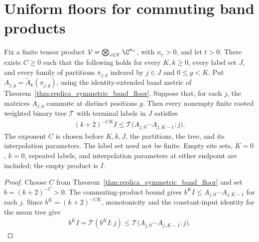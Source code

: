 \section{Uniform floors for commuting band products}

\begin{theorem}
    \label{thm:replica_symmetric_product_mean_floor}
    \leanok
    Fix a finite tensor product $\mathcal V=\bigotimes_{v\in V}\C^{n_v}$,
    with $n_v>0$, and let $t>0$. There exists $C\ge0$ such that the
    following holds for every $K,k\ge0$, every label set $J$, and every
    family of partitions $\pi_{j,g}$ indexed by $j\in J$ and $0\le g<K$.
    Put $A_{j,g}=\widetilde A_k(\pi_{j,g})$, using the identity-extended
    band metric of Theorem~\ref{thm:replica_symmetric_band_floor}.
    Suppose that, for each $j$, the matrices $A_{j,g}$ commute at distinct
    positions $g$. Then every nonempty finite rooted weighted binary tree
    $\mathcal T$ with terminal labels in $J$ satisfies
    \begin{align}
        (k+2)^{-CK}I
        \le \mathcal T\bigl(A_{j,0}\cdots A_{j,K-1}:j\bigr).
    \end{align}
    The exponent $C$ is chosen before $K,k,J$, the partitions, the tree,
    and its interpolation parameters. The label set need not be finite.
    Empty site sets, $K=0$, $k=0$, repeated labels, and interpolation
    parameters at either endpoint are included; the empty product is $I$.
\end{theorem}

\begin{proof}
    \leanok
    Choose $C$ from Theorem~\ref{thm:replica_symmetric_band_floor} and
    set $b=(k+2)^{-C}>0$. The commuting-product bound gives
    $b^KI\le A_{j,0}\cdots A_{j,K-1}$ for each $j$.
    Since $b^K=(k+2)^{-CK}$, monotonicity and the constant-input identity
    for the mean tree give
    \begin{align}
        b^KI=\mathcal T(b^KI:j)
        \le\mathcal T\bigl(A_{j,0}\cdots A_{j,K-1}:j\bigr).
    \end{align}
\end{proof}

